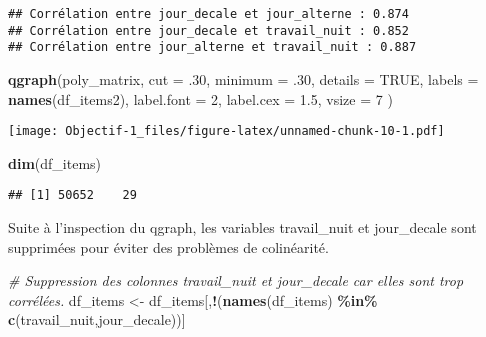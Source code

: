 \documentclass[
]{article}
\newenvironment{Shaded}{\begin{snugshade}}{\end{snugshade}}
\newcommand{\AttributeTok}[1]{\textcolor[rgb]{0.13,0.29,0.53}{#1}}
\newcommand{\CommentTok}[1]{\textcolor[rgb]{0.56,0.35,0.01}{\textit{#1}}}
\newcommand{\ConstantTok}[1]{\textcolor[rgb]{0.56,0.35,0.01}{#1}}
\newcommand{\DecValTok}[1]{\textcolor[rgb]{0.00,0.00,0.81}{#1}}
\newcommand{\FloatTok}[1]{\textcolor[rgb]{0.00,0.00,0.81}{#1}}
\newcommand{\FunctionTok}[1]{\textcolor[rgb]{0.13,0.29,0.53}{\textbf{#1}}}
\newcommand{\NormalTok}[1]{#1}
\newcommand{\OtherTok}[1]{\textcolor[rgb]{0.56,0.35,0.01}{#1}}
\newcommand{\SpecialCharTok}[1]{\textcolor[rgb]{0.81,0.36,0.00}{\textbf{#1}}}
\newcommand{\StringTok}[1]{\textcolor[rgb]{0.31,0.60,0.02}{#1}}
\begin{document}
\begin{verbatim}
## Corrélation entre jour_decale et jour_alterne : 0.874
## Corrélation entre jour_decale et travail_nuit : 0.852
## Corrélation entre jour_alterne et travail_nuit : 0.887
\end{verbatim}

\begin{Shaded}
\begin{Highlighting}[]
\FunctionTok{qgraph}\NormalTok{(poly\_matrix,}
       \AttributeTok{cut =}\NormalTok{ .}\DecValTok{30}\NormalTok{,}
       \AttributeTok{minimum =}\NormalTok{ .}\DecValTok{30}\NormalTok{,}
       \AttributeTok{details =} \ConstantTok{TRUE}\NormalTok{,}
       \AttributeTok{labels =} \FunctionTok{names}\NormalTok{(df\_items2),}
       \AttributeTok{label.font =} \DecValTok{2}\NormalTok{,}
       \AttributeTok{label.cex =} \FloatTok{1.5}\NormalTok{,}
       \AttributeTok{vsize =} \DecValTok{7}
\NormalTok{)}
\end{Highlighting}
\end{Shaded}

\texttt{[image: Objectif-1\_files/figure-latex/unnamed-chunk-10-1.pdf]}

\begin{Shaded}
\begin{Highlighting}[]
\FunctionTok{dim}\NormalTok{(df\_items)}
\end{Highlighting}
\end{Shaded}

\begin{verbatim}
## [1] 50652    29
\end{verbatim}

Suite à l'inspection du qgraph, les variables travail\_nuit et
jour\_decale sont supprimées pour éviter des problèmes de colinéarité.

\begin{Shaded}
\begin{Highlighting}[]
\CommentTok{\# Suppression des colonnes \textquotesingle{}travail\_nuit\textquotesingle{} et \textquotesingle{}jour\_decale\textquotesingle{} car elles sont trop corrélées.}
\NormalTok{df\_items }\OtherTok{\textless{}{-}}\NormalTok{ df\_items[,}\SpecialCharTok{!}\NormalTok{(}\FunctionTok{names}\NormalTok{(df\_items) }\SpecialCharTok{\%in\%} \FunctionTok{c}\NormalTok{(}\StringTok{\textquotesingle{}travail\_nuit\textquotesingle{}}\NormalTok{,}\StringTok{\textquotesingle{}jour\_decale\textquotesingle{}}\NormalTok{))]}
\end{Highlighting}
\end{Shaded}
\end{document}
